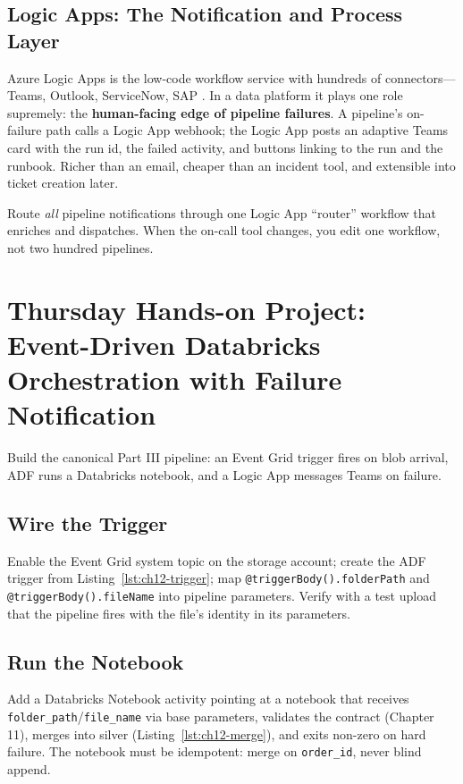 \subsection{Logic Apps: The Notification and Process Layer}
Azure Logic Apps is the low-code workflow service with hundreds of connectors---Teams, Outlook, ServiceNow, SAP \cite{microsoft2025logicApps}. In a data platform it plays one role supremely: the \textbf{human-facing edge of pipeline failures}. A pipeline's on-failure path calls a Logic App webhook; the Logic App posts an adaptive Teams card with the run id, the failed activity, and buttons linking to the run and the runbook. Richer than an email, cheaper than an incident tool, and extensible into ticket creation later.

\begin{tipbox}
Route \emph{all} pipeline notifications through one Logic App ``router'' workflow that enriches and dispatches. When the on-call tool changes, you edit one workflow, not two hundred pipelines.
\end{tipbox}

\section{Thursday Hands-on Project: Event-Driven Databricks Orchestration with Failure Notification}
Build the canonical Part III pipeline: an Event Grid trigger fires on blob arrival, ADF runs a Databricks notebook, and a Logic App messages Teams on failure.

\subsection{Wire the Trigger}
Enable the Event Grid system topic on the storage account; create the ADF trigger from Listing~\ref{lst:ch12-trigger}; map \texttt{@triggerBody().folderPath} and \texttt{@triggerBody().fileName} into pipeline parameters. Verify with a test upload that the pipeline fires with the file's identity in its parameters.

\subsection{Run the Notebook}
Add a Databricks Notebook activity pointing at a notebook that receives \texttt{folder\_path}/\texttt{file\_name} via base parameters, validates the contract (Chapter 11), merges into silver (Listing~\ref{lst:ch12-merge}), and exits non-zero on hard failure. The notebook must be idempotent: merge on \texttt{order\_id}, never blind append.

